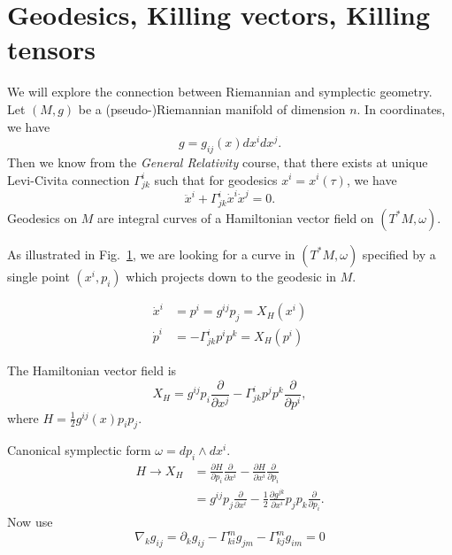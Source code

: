 
\section{Geodesics, Killing vectors, Killing tensors}%
\label{sec:geodesics_killing_vectors_killing_tensors}

We will explore the connection between Riemannian and symplectic geometry.
Let $(M, g)$ be a (pseudo-)Riemannian manifold of dimension $n$.
In coordinates, we have
\begin{equation}
  g = g_{ij} (x) dx^{i} dx^{j}.
\end{equation}
Then we know from the \emph{General Relativity} course, that there exists at unique Levi-Civita connection $\Gamma^{i}_{jk}$ such that for geodesics $x^{i} = x^{i}(\tau)$, we have
\begin{equation}
  \ddot{x}^{i} + \Gamma^{i}_{jk} \dot{x}^{i} \dot{x}^{j} = 0.
\end{equation}
Geodesics on $M$ are integral curves of a Hamiltonian vector field on $(T^*M, \omega)$.

As illustrated in Fig.~\ref{fig:l8f1}, we are looking for a curve in $(T^*M, \omega)$ specified by a single point $(x^{i}, p_i)$ which projects down to the geodesic in $M$.
\begin{figure}[tbhp]
  \centering
  \def\svgwidth{0.4\columnwidth}
  
  \caption{}
  \label{fig:l8f1}
\end{figure}

\begin{align}
  \dot{x}^{i} &= p^{i} = g^{ij} p_j = X_H (x^{i}) \\
  \dot{p}^{i} &= -\Gamma^{i}_{jk} p^{i} p^{k} = X_H (p^{i})
\end{align}

The Hamiltonian vector field is 
\begin{equation}
  X_H = g^{ij} p_i \frac{\partial }{\partial x^{j}} - \Gamma^{i}_{jk} p^{j} p^{k} \frac{\partial }{\partial p^{i}},
\end{equation}
where $H = \frac{1}{2} g^{ij}(x) p_{i} p_{j}$.

Canonical symplectic form $\omega = dp_i \wedge dx^{i}$.
\begin{align}
  H \rightarrow X_H &= \frac{\partial H}{\partial p_i} \frac{\partial }{\partial x^{i}} - \frac{\partial H}{\partial x^{i}} \frac{\partial }{\partial p_i} \\
  &= g^{ij} p_j \frac{\partial }{\partial x^{i}} - \frac{1}{2} \frac{\partial g^{jk}}{\partial x^{i}} p_j p_k \frac{\partial }{\partial p_i}.
\end{align}
Now use
\begin{equation}
  \label{eq:8-star}
  \nabla_k g_{ij} = \partial_k g_{ij} - \Gamma^{m}_{ki} g_{jm} - \Gamma^{m}_{kj} g_{im} = 0
\end{equation}

